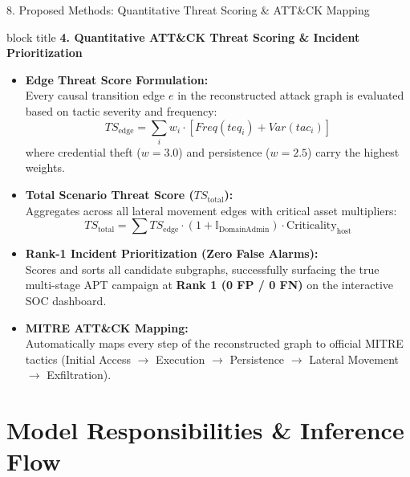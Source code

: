 \documentclass[aspectratio=169,10pt]{beamer}
\begin{document}
\begin{frame}[t]{8. Proposed Methods: Quantitative Threat Scoring \& ATT\&CK Mapping}
\vspace{-0.25em}
\begin{beamercolorbox}[rounded=true,shadow=false,sep=0.30em,wd=\textwidth]{block title}
\textbf{\scriptsize 4. Quantitative ATT\&CK Threat Scoring \& Incident Prioritization}
\end{beamercolorbox}
\vspace{0.08em}
{\fontsize{6.8pt}{9.2pt}\selectfont
\setlength{\abovedisplayskip}{1.5pt}
\setlength{\belowdisplayskip}{1.5pt}
\begin{itemize}\itemsep0.10em
  \item \textbf{Edge Threat Score Formulation:}\\
  Every causal transition edge $e$ in the reconstructed attack graph is evaluated based on tactic severity and frequency:
  $$TS_{\text{edge}} = \sum_{i} w_i \cdot \left[ Freq(teq_i) + Var(tac_i) \right]$$
  where credential theft ($w=3.0$) and persistence ($w=2.5$) carry the highest weights.
  \item \textbf{Total Scenario Threat Score ($TS_{\text{total}}$):}\\
  Aggregates across all lateral movement edges with critical asset multipliers:
  $$TS_{\text{total}} = \sum TS_{\text{edge}} \cdot (1 + \mathbb{I}_{\text{DomainAdmin}}) \cdot \text{Criticality}_{\text{host}}$$
  \item \textbf{Rank-1 Incident Prioritization (Zero False Alarms):}\\
  Scores and sorts all candidate subgraphs, successfully surfacing the true multi-stage APT campaign at \textbf{Rank 1 (0 FP / 0 FN)} on the interactive SOC dashboard.
  \item \textbf{MITRE ATT\&CK Mapping:}\\
  Automatically maps every step of the reconstructed graph to official MITRE tactics (Initial Access $\to$ Execution $\to$ Persistence $\to$ Lateral Movement $\to$ Exfiltration).
\end{itemize}
}
\end{frame}

\section{Model Responsibilities \& Inference Flow}
\end{document}

